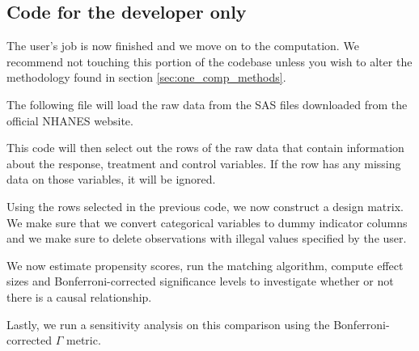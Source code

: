 \documentclass[12pt]{article}
\begin{document}
\subsection{Code for the developer only}

The user's job is now finished and we move on to the computation. We recommend not touching this portion of the codebase unless you wish to alter the methodology found in section \ref{sec:one_comp_methods}.

The following file will load the raw data from the SAS files downloaded from the official NHANES website.


\vspace{0.3cm}

This code will then select out the rows of the raw data that contain information about the response, treatment and control variables. If the row has any missing data on those variables, it will be ignored.


\vspace{0.3cm}

Using the rows selected in the previous code, we now construct a design matrix. We make sure that we convert categorical variables to dummy indicator columns and we make sure to delete observations with illegal values specified by the user.


\vspace{0.3cm}

We now estimate propensity scores, run the matching algorithm, compute effect sizes and Bonferroni-corrected significance levels to investigate whether or not there is a causal relationship.


\vspace{0.3cm}

Lastly, we run a sensitivity analysis on this comparison using the Bonferroni-corrected $\Gamma$ metric.


\end{document}
